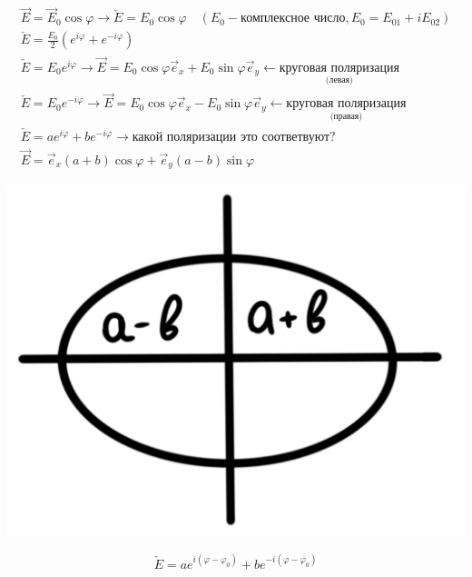 \begin{gather*}
    \vec{E}=\vec{E}_0\cos\varphi\rightarrow\check{E}=E_0\cos\varphi\quad(E_0-\text{комплексное число}, E_0=E_{01}+iE_{02}  ) \\
    \check{E}=\frac{E_0}{2}(e^{i\varphi}+e^{-i\varphi}  ) \\
    \check{E}=E_0e^{i\varphi}\rightarrow \vec{E}=E_0\cos\varphi\vec{e}_x+E_0\sin\varphi\vec{e}_y\leftarrow \underset{\text{(левая)}}{\text{круговая поляризация}} \\ 
    \check{E}=E_0e^{-i\varphi}\rightarrow \vec{E}=E_0\cos\varphi\vec{e}_x-E_0\sin\varphi\vec{e}_y\leftarrow \underset{\text{(правая)}}{\text{круговая поляризация}} \\
    \check{E}=ae^{i\varphi}+be^{-i\varphi}\rightarrow \text{какой поляризации это соответвуют?} \\
    \vec{E}=\vec{e}_x (a+b)\cos\varphi+\vec{e}_y (a-b)\sin\varphi
\end{gather*}

\begin{minipage}[c]{0.2\textwidth} %
    \includegraphics[width=\textwidth]{im/103.png}%
\end{minipage}%
\hfill
\begin{minipage}[c]{0.6\textwidth} %
\[
\check{E}=ae^{i(\varphi-\varphi_0)}+be^{-i(\varphi-\varphi_0)}
\]
\end{minipage}

